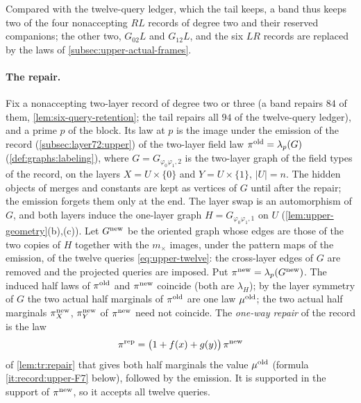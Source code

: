 Compared with the twelve-query ledger, which the tail keeps, a band thus keeps
two of the four nonaccepting $RL$ records of degree two and their reserved
companions; the other two, $G_{02}L$ and $G_{12}L$, and the six $LR$ records are
replaced by the laws of \cref{subsec:upper-actual-frames}.

\paragraph{The repair.}
Fix a nonaccepting two-layer record of degree two or three (a band repairs $84$
of them, \cref{lem:six-query-retention}; the tail repairs all $94$ of the
twelve-query ledger), and a prime $p$ of the block. Its law at $p$ is the image
under the emission of the record (\cref{subsec:layer72:upper}) of the two-layer
field law $\pi^{\rm old}=\lambda_p(G)$ (\cref{def:graphs:labeling}), where
$G=G_{\varphi_0\varphi_1,2}$ is the two-layer graph of the field types of the
record, on the layers $X=U\times\{0\}$ and $Y=U\times\{1\}$, $|U|=n$. The
hidden objects of merges and constants are kept as vertices of $G$ until
after the repair; the emission forgets them only at the end. The layer swap
is an automorphism of $G$, and both layers induce the one-layer graph
$H=G_{\varphi_0\varphi_1,1}$ on $U$ (\cref{lem:upper-geometry}(b),(c)). Let
$G^{\rm new}$ be the oriented graph whose edges are those of the two copies
of $H$ together with the $m_\times$ images, under the pattern maps of the
emission, of the twelve queries \eqref{eq:upper-twelve}: the cross-layer
edges of $G$ are removed and the projected queries are imposed. Put
$\pi^{\rm new}=\lambda_p(G^{\rm new})$.
The induced half laws of $\pi^{\rm old}$ and $\pi^{\rm new}$ coincide (both
are $\lambda_H$); by the layer symmetry of $G$ the two actual half marginals
of $\pi^{\rm old}$ are one law $\mu^{\rm old}$; the two actual half
marginals $\pi^{\rm new}_X$, $\pi^{\rm new}_Y$ of $\pi^{\rm new}$ need not
coincide. The \emph{one-way repair} of the record is the law
\[
 \pi^{\rm rep}=\bigl(1+f(x)+g(y)\bigr)\,\pi^{\rm new}
\]
of \cref{lem:tr:repair} that gives both half marginals the value
$\mu^{\rm old}$ (formula \ref{it:record:upper-F7} below), followed by the
emission. It is supported in the support of $\pi^{\rm new}$, so it accepts
all twelve queries.

